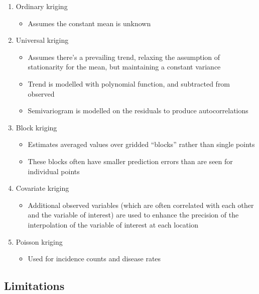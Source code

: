 \documentclass{article}
\begin{document}
\begin{enumerate}
    \item Ordinary kriging
    \begin{itemize}
        \item Assumes the constant mean is unknown
    \end{itemize}
    \item Universal kriging
    \begin{itemize}
        \item Assumes there's a prevailing trend, relaxing the assumption of stationarity for the mean, but maintaining a constant variance
        \item Trend is modelled with polynomial function, and subtracted from observed
        \item Semivariogram is modelled on the residuals to produce autocorrelations
    \end{itemize}
    \item Block kriging
    \begin{itemize}
        \item Estimates averaged values over gridded “blocks” rather than single points
        \item These blocks often have smaller prediction errors than are seen for individual points
    \end{itemize}
    \item Covariate kriging
    \begin{itemize}
        \item Additional observed variables (which are often correlated with each other and the variable of interest) are used to enhance the precision of the interpolation of the variable of interest at each location
    \end{itemize}
    \item Poisson kriging
    \begin{itemize}
        \item Used for incidence counts and disease rates 
    \end{itemize}
\end{enumerate}

\subsection{Limitations}

\begin{center}
\end{center}
\end{document}
